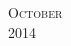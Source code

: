 \documentclass[landscape]{article}
\begin{document}
\newpage

\begin{center}
\textsc{\LARGE October}\\ %
\textsc{\large 2014} %
\end{center}


\begin{calendar}{\hsize}
 




\BlankDay
\BlankDay
\BlankDay




\end{calendar}
\end{document}
